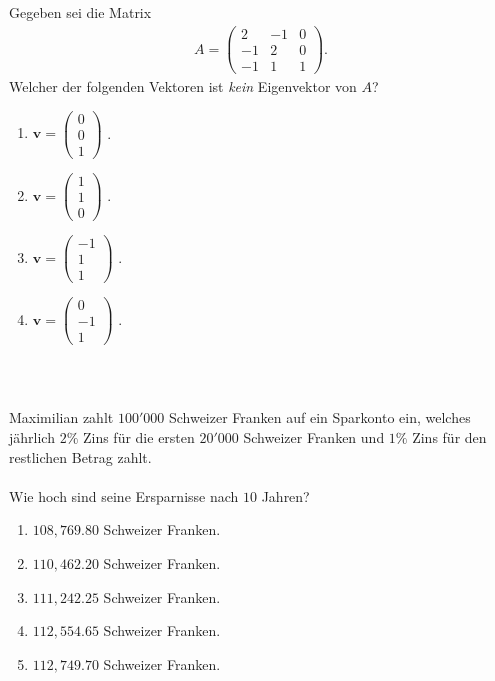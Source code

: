 \subsection*{}
Gegeben sei die Matrix
\begin{align*}
	A =
	\begin{pmatrix}
		2 & -1 & 0 \\
		-1 & 2 & 0 \\
		-1 & 1 & 1
	\end{pmatrix}
	.
\end{align*}
Welcher der folgenden Vektoren ist \textit{kein} Eigenvektor von $A$?
\renewcommand{\labelenumi}{(\alph{enumi})}
\begin{enumerate}
	\item 
	$ 
	\mathbf{v}
	=
	\begin{pmatrix}
		0\\ 0 \\ 1
	\end{pmatrix}
	$
	.
	\item 
		$ 
	\mathbf{v}
	=
	\begin{pmatrix}
		1\\ 1 \\ 0
	\end{pmatrix}
	$
	.
	\item
	$ 
	\mathbf{v}
	=
	\begin{pmatrix}
		-1\\ 1 \\ 1
	\end{pmatrix}
	$
	.
	\item
		$ 
	\mathbf{v}
	=
	\begin{pmatrix}
		0\\ -1 \\ 1
	\end{pmatrix}
	$
	.
\end{enumerate}
\ \\
\subsection*{}
Maximilian zahlt $100'000$ Schweizer Franken auf ein Sparkonto ein, welches jährlich $2 \%$ Zins für die ersten $20'000$ Schweizer Franken und $1 \%$ Zins für den restlichen Betrag zahlt.\\
\\
Wie hoch sind seine Ersparnisse nach $10 $ Jahren?
\renewcommand{\labelenumi}{(\alph{enumi})}
\begin{enumerate}
\item
$108,769.80$ Schweizer Franken.
\item
$110,462.20$ Schweizer Franken.	
\item 
$111,242.25$ Schweizer Franken.
\item
$112,554.65$ Schweizer Franken.
\item
$112,749.70$ Schweizer Franken.
\end{enumerate}
\ \\
